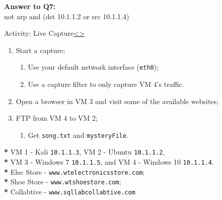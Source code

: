 \documentclass[12pt]{extarticle}
\newenvironment{instructionblock}{\Large\bgroup}{\egroup}
\newcommand{\ben}{\begin{enumerate}}
\newcommand{\een}{\end{enumerate}}
\begin{document}
	\noindent
	\textbf{Answer to Q7:}\\
	not arp and (dst 10.1.1.2 or src 10.1.1.4)
	
	
	
	
	\pagebreak
	\begin{slide}{Activity: Live Capture}{\hyperref[slide 28]{\textless}\hyperref[slide 30]{\textgreater}}
		\begin{instructionblock}
			\begin{enumerate}
				\item Start a capture;
				\ben
					\item Use your default network interface (\texttt{eth0});
					\item Use a capture filter to only capture VM 4's traffic.
				\een
				\item Open a browser in VM 3 and visit some of the available websites;
				\item FTP from VM 4 to VM 2;
				\ben
					\item Get \texttt{song.txt} and \texttt{mysteryFile}.
				\een
			\end{enumerate}
		\end{instructionblock}
	\end{slide}
	
	\vspace{4mm}
	\noindent
	\textbf{*} VM 1 - Kali \texttt{10.1.1.3}, VM 2 - Ubuntu \texttt{10.1.1.2},\\
	\textbf{*} VM 3 - Windows 7 \texttt{10.1.1.5}, and VM 4 - Windows 10 \texttt{10.1.1.4}.\\
	{\textbf{*}} Elec Store - \texttt{www.wtelectronicsstore.com};\\
	{\textbf{*}} Shoe Store - \texttt{www.wtshoestore.com};\\
	{\textbf{*}} Collabtive - \texttt{www.sqllabcollabtive.com}
	
\end{document}

